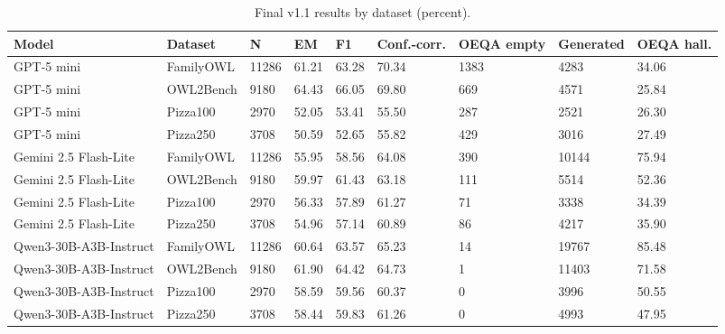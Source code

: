 \begin{table}[t]
\centering
\small
\begin{tabular}{lllllllll}
\toprule
Model & Dataset & N & EM & F1 & Conf.-corr. & OEQA empty & Generated & OEQA hall. \\
\midrule
GPT-5 mini & FamilyOWL & 11286 & 61.21 & 63.28 & 70.34 & 1383 & 4283 & 34.06 \\
GPT-5 mini & OWL2Bench & 9180 & 64.43 & 66.05 & 69.80 & 669 & 4571 & 25.84 \\
GPT-5 mini & Pizza100 & 2970 & 52.05 & 53.41 & 55.50 & 287 & 2521 & 26.30 \\
GPT-5 mini & Pizza250 & 3708 & 50.59 & 52.65 & 55.82 & 429 & 3016 & 27.49 \\
Gemini 2.5 Flash-Lite & FamilyOWL & 11286 & 55.95 & 58.56 & 64.08 & 390 & 10144 & 75.94 \\
Gemini 2.5 Flash-Lite & OWL2Bench & 9180 & 59.97 & 61.43 & 63.18 & 111 & 5514 & 52.36 \\
Gemini 2.5 Flash-Lite & Pizza100 & 2970 & 56.33 & 57.89 & 61.27 & 71 & 3338 & 34.39 \\
Gemini 2.5 Flash-Lite & Pizza250 & 3708 & 54.96 & 57.14 & 60.89 & 86 & 4217 & 35.90 \\
Qwen3-30B-A3B-Instruct & FamilyOWL & 11286 & 60.64 & 63.57 & 65.23 & 14 & 19767 & 85.48 \\
Qwen3-30B-A3B-Instruct & OWL2Bench & 9180 & 61.90 & 64.42 & 64.73 & 1 & 11403 & 71.58 \\
Qwen3-30B-A3B-Instruct & Pizza100 & 2970 & 58.59 & 59.56 & 60.37 & 0 & 3996 & 50.55 \\
Qwen3-30B-A3B-Instruct & Pizza250 & 3708 & 58.44 & 59.83 & 61.26 & 0 & 4993 & 47.95 \\
\bottomrule
\end{tabular}
\caption{Final v1.1 results by dataset (percent).}
\label{tab:core-v11-dataset}
\end{table}

